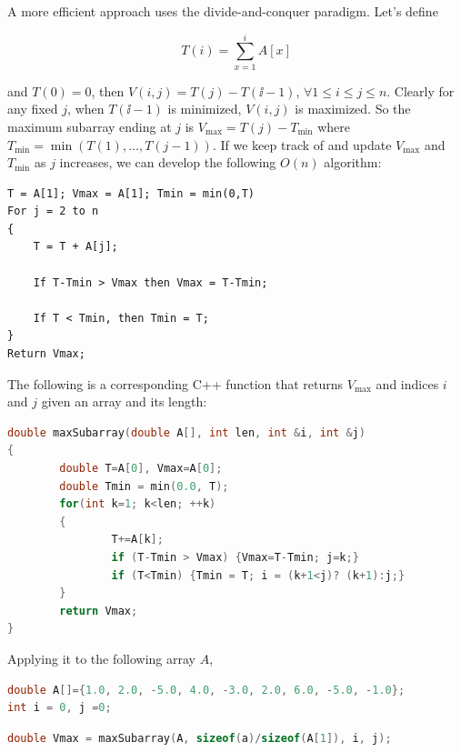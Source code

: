 

A more efficient approach uses the divide-and-conquer paradigm. Let's define

\[
T(i)=\sum_{x=1}^{i} A[x]
\]

and $T(0)=0$, then $V(i,j)=T(j)-T(\ii-1)$, $\forall 1\leq i\leq j\leq n$. Clearly for
any fixed $j$, when $T(\ii-1)$ is minimized, $V(i,j)$ is maximized. So the maximum
subarray ending at $j$ is $V_{\max}=T(j)-T_{\min}$ where
$T_{\min}=\min(T(1),\ldots,T(j-1))$. If we keep track of and update $V_{\max}$ and
$T_{\min}$ as $j$ increases, we can develop the following $O(n)$ algorithm:

\begin{lstlisting}
T = A[1]; Vmax = A[1]; Tmin = min(0,T)
For j = 2 to n
{
    T = T + A[j];

    If T-Tmin > Vmax then Vmax = T-Tmin;

    If T < Tmin, then Tmin = T;
}
Return Vmax;
\end{lstlisting}

The following is a corresponding C++ function that returns $V_{\max}$ and indices $i$ and $j$
given an array and its length:

\begin{lstlisting}[language=C++]
double maxSubarray(double A[], int len, int &i, int &j)
{
        double T=A[0], Vmax=A[0];
        double Tmin = min(0.0, T);
        for(int k=1; k<len; ++k)
        {
                T+=A[k];
                if (T-Tmin > Vmax) {Vmax=T-Tmin; j=k;}
                if (T<Tmin) {Tmin = T; i = (k+1<j)? (k+1):j;}
        }
        return Vmax;
}
\end{lstlisting}

Applying it to the following array $A$,

\begin{lstlisting}[language=C++]
double A[]={1.0, 2.0, -5.0, 4.0, -3.0, 2.0, 6.0, -5.0, -1.0};
int i = 0, j =0;
\end{lstlisting}


\begin{lstlisting}[language=C++]
double Vmax = maxSubarray(A, sizeof(a)/sizeof(A[1]), i, j);
\end{lstlisting}

